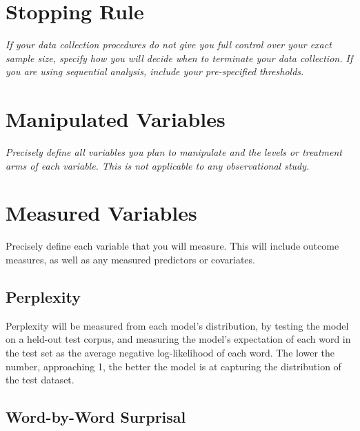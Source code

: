 \documentclass[12pt]{article}
\begin{document}
\section{Stopping Rule}

\textit{If your data collection procedures do not give you full control over your exact sample size, specify how you will decide when to terminate your data collection. If you are using sequential analysis, include your pre-specified thresholds.}

\section{Manipulated Variables}

\textit{Precisely define all variables you plan to manipulate and the levels or treatment arms of each variable. This is not applicable to any observational study.}

\section{Measured Variables}

Precisely define each variable that you will measure. This will include outcome measures, as well as any measured predictors or covariates.

\subsection{Perplexity}

Perplexity will be measured from each model's distribution, by testing the model on a held-out test corpus, and measuring the model's expectation of each word in the test set as the average negative log-likelihood of each word. The lower the number, approaching 1, the better the model is at capturing the distribution of the test dataset.

\subsection{Word-by-Word Surprisal}
\end{document}
